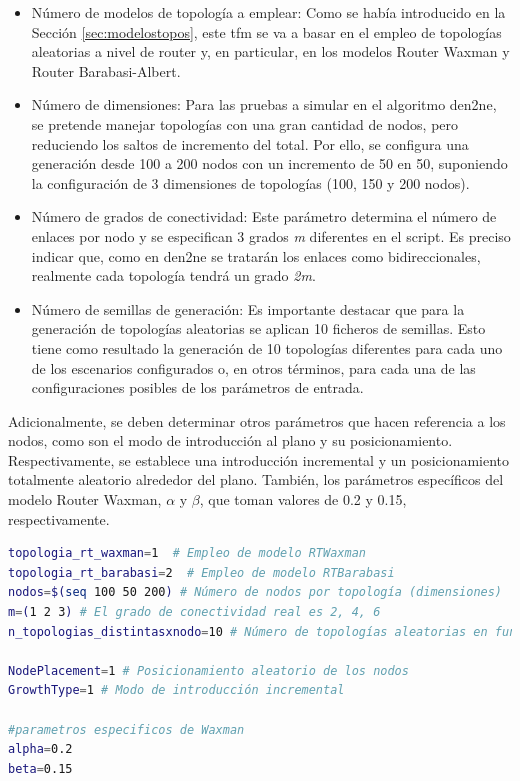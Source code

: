 \begin{itemize}
    \item Número de modelos de topología a emplear: Como se había introducido en la Sección \ref{sec:modelostopos}, este \gls{tfm} se va a basar en el empleo de topologías aleatorias a nivel de router y, en particular, en los modelos Router Waxman y Router Barabasi-Albert. 
    \item Número de dimensiones: Para las pruebas a simular en el algoritmo \gls{den2ne}, se pretende manejar topologías con una gran cantidad de nodos, pero reduciendo los saltos de incremento del total. Por ello, se configura una generación desde 100 a 200 nodos con un incremento de 50 en 50, suponiendo la configuración de 3 dimensiones de topologías (100, 150 y 200 nodos). 
    \item Número de grados de conectividad: Este parámetro determina el número de enlaces por nodo y se especifican 3 grados \textit{m} diferentes en el script. Es preciso indicar que, como en \gls{den2ne} se tratarán los enlaces como bidireccionales, realmente cada topología tendrá un grado \textit{2m}.
    \item Número de semillas de generación: Es importante destacar que para la generación de topologías aleatorias se aplican 10 ficheros de semillas. Esto tiene como resultado la generación de 10 topologías diferentes para cada uno de los escenarios configurados o, en otros términos, para cada una de las configuraciones posibles de los parámetros de entrada.
\end{itemize}

\vspace{3mm}

Adicionalmente, se deben determinar otros parámetros que hacen referencia a los nodos, como son el modo de introducción al plano y su posicionamiento. Respectivamente, se establece una introducción incremental y un posicionamiento totalmente aleatorio alrededor del plano. También, los parámetros específicos del modelo Router Waxman, $\alpha$ y $\beta$, que toman valores de 0.2 y 0.15, respectivamente.

\vspace{3mm}

\begin{lstlisting}[language=bash, style=Consola, caption={Configuración de los parámetros de entrada en el script de automatización de \acrshort{brite}}]
topologia_rt_waxman=1  # Empleo de modelo RTWaxman
topologia_rt_barabasi=2  # Empleo de modelo RTBarabasi
nodos=$(seq 100 50 200) # Número de nodos por topología (dimensiones)
m=(1 2 3) # El grado de conectividad real es 2, 4, 6
n_topologias_distintasxnodo=10 # Número de topologías aleatorias en función del número de semillas

NodePlacement=1 # Posicionamiento aleatorio de los nodos
GrowthType=1 # Modo de introducción incremental

#parametros especificos de Waxman
alpha=0.2
beta=0.15
\end{lstlisting}

